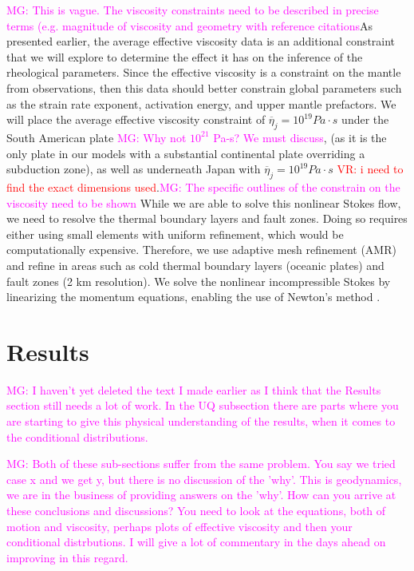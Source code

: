 \documentclass[12pt]{article}
\newcommand{\mgnote}[1]{\textcolor{magenta}{MG: #1}}
\newcommand{\vrnote}[1]{\textcolor{red}{VR: #1}}
\begin{document}
{\mgnote{This is vague. The viscosity constraints need to be described in precise terms (e.g. magnitude of viscosity and geometry with reference citations}As presented earlier, the average effective viscosity data is an additional constraint that we will explore to determine the effect it has on the inference of the rheological parameters. Since the effective viscosity is a constraint on the mantle from observations, then this data should better constrain global parameters such as the strain rate exponent, activation energy, and upper mantle prefactors. We will place the average effective viscosity constraint of $\overline{\eta}_j = 10^{19} Pa\cdot s$ under the South American plate \mgnote{Why not $10^21$ Pa-s? We must discuss}, (as it is the only plate in our models with a substantial continental plate overriding a subduction zone), as well as underneath Japan with $\overline{\eta}_j = 10^{19} Pa\cdot s$ \citep{hu2016asthenosphere} \vrnote{i need to find the exact dimensions used}.\mgnote{The specific outlines of the constrain on the viscosity need to be shown}
 While we are able to solve this nonlinear Stokes flow, we need to resolve the thermal boundary layers and fault zones. Doing so requires either using small elements with uniform refinement, which would be computationally expensive. Therefore, we use adaptive mesh refinement (AMR) and refine in areas such as cold thermal boundary layers (oceanic plates) and fault zones (2 km resolution). 
We solve the nonlinear incompressible Stokes by linearizing the momentum equations, enabling the use of Newton's method \citep{rudi2015extreme}. 

\section{Results}

\mgnote{I haven't yet deleted the text I made earlier as I think that the Results section still needs a lot of work. In the UQ subsection there are parts where you are starting to give this physical understanding of the results, when it comes to the conditional distributions.}

\mgnote{Both of these sub-sections suffer from the same problem. You say we tried case x and we get y, but there is no discussion of the 'why'. This is geodynamics, we are in the business of providing answers on the 'why'. How can you arrive at these conclusions and discussions? You need to look at the equations, both of motion and  viscosity, perhaps plots of effective viscosity and then your conditional distrbutions. I will give a lot of commentary in the days ahead on improving in this regard.}

}
\end{document}

